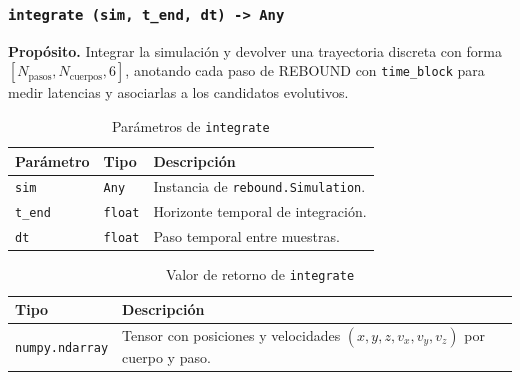 \subsubsection*{\texttt{integrate~(sim, t\_end, dt) -> Any}}
\textbf{Propósito.} Integrar la simulación y devolver una trayectoria discreta con forma \([N_{\text{pasos}}, N_{\text{cuerpos}}, 6]\), anotando cada paso de REBOUND con \texttt{time\_block} para medir latencias y asociarlas a los candidatos evolutivos.

\begin{table}[H]
  \centering
  \caption{Parámetros de \texttt{integrate}}
  \small
  \begin{tabularx}{\textwidth}{@{}p{}p{}X@{}}
    \toprule
    \textbf{Parámetro} & \textbf{Tipo} & \textbf{Descripción} \\
    \midrule
    \texttt{sim} & \texttt{Any} & Instancia de \texttt{rebound.Simulation}. \\
    \texttt{t\_end} & \texttt{float} & Horizonte temporal de integración. \\
    \texttt{dt} & \texttt{float} & Paso temporal entre muestras. \\
    \bottomrule
  \end{tabularx}
\end{table}
\vspace{0.2cm}

\begin{table}[H]
  \centering
  \caption{Valor de retorno de \texttt{integrate}}
  \small
  \begin{tabularx}{\textwidth}{@{}p{}X@{}}
    \toprule
    \textbf{Tipo} & \textbf{Descripción} \\
    \midrule
    \texttt{numpy.ndarray} & Tensor con posiciones y velocidades \((x,y,z,v_x,v_y,v_z)\) por cuerpo y paso. \\
    \bottomrule
  \end{tabularx}
\end{table}
\vspace{0.2cm}

